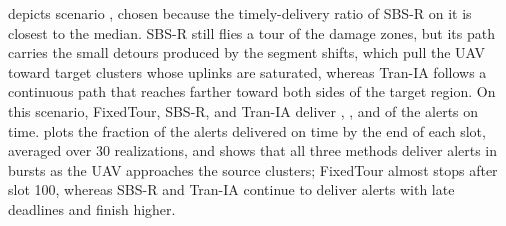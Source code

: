  depicts scenario \ResultExtTraceScenario, chosen because the timely-delivery ratio of SBS-R on it is closest to the median. SBS-R still flies a tour of the damage zones, but its path carries the small detours produced by the segment shifts, which pull the UAV toward target clusters whose uplinks are saturated, whereas Tran-IA follows a continuous path that reaches farther toward both sides of the target region. On this scenario, FixedTour, SBS-R, and Tran-IA deliver \ResultExtTraceBone, \ResultExtTraceP, and \ResultExtTraceTRAN{} of the alerts on time.  plots the fraction of the \ResultExtTraceAlertCount{} alerts delivered on time by the end of each slot, averaged over 30 realizations, and shows that all three methods deliver alerts in bursts as the UAV approaches the source clusters; FixedTour almost stops after slot 100, whereas SBS-R and Tran-IA continue to deliver alerts with late deadlines and finish higher.

